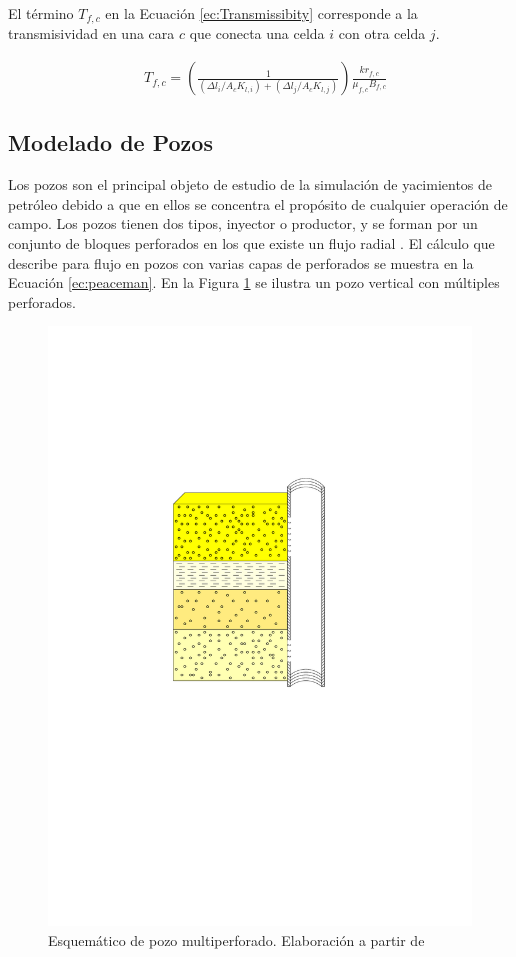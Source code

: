 El término $T_{f,c}$ en la Ecuación \ref{ec:Transmissibity} corresponde a la transmisividad en una cara $c$ que conecta una celda $i$ con otra celda $j$.

\begin{align}
	\label{ec:Transmissibity}& T_{f,c} = \left(\frac{1}{(\Delta l_{i}/A_{c}K_{l,i})+(\Delta l_{j}/A_{c}K_{l,j})}\right)\frac{kr_{f,c}}{\mu_{f,c}B_{f,c}}
\end{align}
\subsection{Modelado de Pozos}
%
Los pozos son el principal objeto de estudio de la simulación de yacimientos de petróleo debido a que en ellos se concentra el propósito de cualquier operación de campo. Los pozos tienen dos tipos, inyector o productor, y se forman por un conjunto de bloques perforados en los que existe un flujo radial \citep{peaceman1983interpretation}. El cálculo que \cite{peaceman1983interpretation} describe para flujo en pozos con varias capas de perforados se muestra en la Ecuación \ref{ec:peaceman}. En la Figura \ref{fig:mulperfwell} se ilustra un pozo vertical con múltiples perforados.

\begin{figure}[h]
	\centering%
	\includegraphics[scale=0.8]{Fig/pozo_multi_perf.pdf}%
	\caption[Esquemático de pozo multiperforado.]{Esquemático de pozo multiperforado. Elaboración a partir de \cite{chen2007reservoir}} \label{fig:mulperfwell}
\end{figure}

